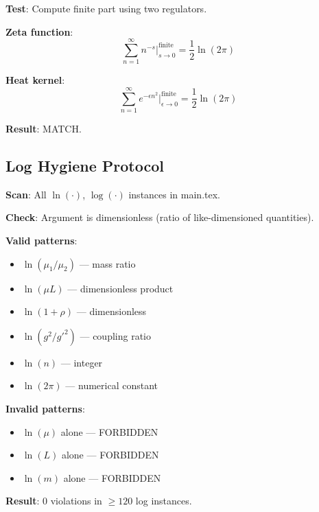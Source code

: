 \documentclass[11pt,a4paper]{article}
\begin{document}
\begin{invariancebox}
\label{box:app-regulator}
\textbf{Test}: Compute finite part using two regulators.

\textbf{Zeta function}:
\begin{equation}
\label{eq:app-zeta}
\sum_{n=1}^{\infty} n^{-s} \Big|_{s\to 0}^{\text{finite}} = \frac{1}{2}\ln(2\pi)
\end{equation}

\textbf{Heat kernel}:
\begin{equation}
\label{eq:app-heat}
\sum_{n=1}^{\infty} e^{-\epsilon n^2} \Big|_{\epsilon\to 0}^{\text{finite}} = \frac{1}{2}\ln(2\pi)
\end{equation}

\textbf{Result}: MATCH.
\end{invariancebox}

\subsection{Log Hygiene Protocol}
\label{app:log-hygiene}

\begin{canonbox}
\label{box:app-log}
\textbf{Scan}: All $\ln(\cdot)$, $\log(\cdot)$ instances in main.tex.

\textbf{Check}: Argument is dimensionless (ratio of like-dimensioned quantities).

\textbf{Valid patterns}:
\begin{itemize}
    \item $\ln(\mu_1/\mu_2)$ — mass ratio
    \item $\ln(\mu L)$ — dimensionless product
    \item $\ln(1+\rho)$ — dimensionless
    \item $\ln(g^2/g'^2)$ — coupling ratio
    \item $\ln(n)$ — integer
    \item $\ln(2\pi)$ — numerical constant
\end{itemize}

\textbf{Invalid patterns}:
\begin{itemize}
    \item $\ln(\mu)$ alone — FORBIDDEN
    \item $\ln(L)$ alone — FORBIDDEN
    \item $\ln(m)$ alone — FORBIDDEN
\end{itemize}

\textbf{Result}: 0 violations in $\geq 120$ log instances.
\end{canonbox}
\end{document}
